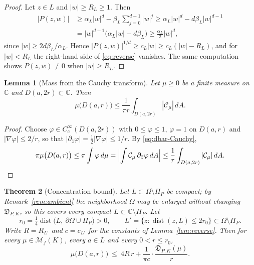 \documentclass[reqno]{amsart}
\newtheorem{theorem}{Theorem}[section]
\newtheorem{lemma}[theorem]{Lemma}
\theoremstyle{definition}
\theoremstyle{remark}
\newcommand{\bC}{\mathbb C}
\newcommand{\M}{\mathcal M}
\newcommand{\Cauchy}{\mathcal C}
\newcommand{\dist}{\operatorname{dist}}
\begin{document}
\begin{proof}
Let $z\in L$ and $|w|\geq R_L\geq1$.  Then
\begin{align*}
 |P(z,w)|
 &\geq\alpha_L|w|^d-\beta_L\sum_{j=0}^{d-1}|w|^{j}
 \geq\alpha_L|w|^d-d\beta_L|w|^{d-1}\\
 &=|w|^{d-1}\bigl(\alpha_L|w|-d\beta_L\bigr)
 \geq\frac{\alpha_L}{2}|w|^{d},
\end{align*}
since $|w|\geq 2d\beta_L/\alpha_L$.  Hence $|P(z,w)|^{1/d}\geq c_L|w|\geq
c_L(|w|-R_L)$, and for $|w|<R_L$ the right-hand side of \eqref{eq:reverse}
vanishes.  The same computation shows $P(z,w)\neq0$ when $|w|\geq R_L$.
\end{proof}

\begin{lemma}[Mass from the Cauchy transform]\label{lem:mass}
Let $\mu\geq0$ be a finite measure on $\bC$ and $D(a,2r)\subset\bC$.  Then
\begin{equation}\label{eq:mass-from-C}
 \mu\bigl(D(a,r)\bigr)
 \leq\frac{1}{\pi r}\int_{D(a,2r)}|\Cauchy_\mu|\,dA .
\end{equation}
\end{lemma}

\begin{proof}
Choose $\varphi\in C_c^\infty(D(a,2r))$ with $0\leq\varphi\leq1$, $\varphi=1$ on
$D(a,r)$ and $|\nabla\varphi|\leq2/r$, so that
$|\partial_{\bar z}\varphi|=\frac12|\nabla\varphi|\leq1/r$.  By
\eqref{eq:dbar-Cauchy},
\[
 \pi\mu\bigl(D(a,r)\bigr)\leq\pi\int\varphi\,d\mu
 =\Bigl|\int\Cauchy_\mu\,\partial_{\bar z}\varphi\,dA\Bigr|
 \leq\frac1r\int_{D(a,2r)}|\Cauchy_\mu|\,dA . \qedhere
\]
\end{proof}

\begin{theorem}[Concentration bound]\label{thm:concentration}
Let $L\subset\Omega\setminus\Pi_P$ be compact; by Remark~\ref{rem:ambient} the
neighborhood $\Omega$ may be enlarged without changing $\mathfrak D_{P,K}$, so
this covers every compact $L\subset\bC\setminus\Pi_P$.  Let
\[
 r_0=\tfrac14\dist\bigl(L,\ \partial\Omega\cup\Pi_P\bigr)>0,
 \qquad
 L'=\{z:\dist(z,L)\leq2r_0\}\subset\Omega\setminus\Pi_P .
\]
Write $R=R_{L'}$ and $c=c_{L'}$ for the constants of Lemma~\ref{lem:reverse}.
Then for every $\mu\in\M_f(K)$, every $a\in L$ and every $0<r\leq r_0$,
\begin{equation}\label{eq:concentration}
 \mu\bigl(D(a,r)\bigr)
 \ \leq\ 4R\,r+\frac{1}{\pi c}\cdot\frac{\mathfrak D_{P,K}(\mu)}{r}.
\end{equation}
\end{theorem}
\end{document}
